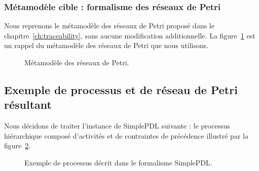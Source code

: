 \FloatBarrier

\subsubsection{Métamodèle cible : formalisme des réseaux de Petri}

Nous reprenons le métamodèle des réseaux de Petri proposé dans le
chapitre~\ref{ch:traceability}, sans aucune modification additionnelle. 
La figure~\ref{fig:petrinetmmodel} est un rappel du métamodèle des réseaux
de Petri que nous utilisons.


\begin{figure}[h]%
  \begin{center}
    
    \caption{Métamodèle des réseaux de Petri.}
    \label{fig:petrinetmmodel}
  \end{center}
\end{figure}

\FloatBarrier

\subsection{Exemple de processus et de réseau de Petri résultant}

Nous décidons de traiter l'instance de SimplePDL suivante : le processus
hiérarchique composé d'activités et de contraintes de précédence illustré par
la figure~\ref{fig:simplepdlusecase}.

\begin{figure}[h]
  \begin{center}
    
    \caption{Exemple de processus décrit dans le formalisme SimplePDL.}
    \label{fig:simplepdlusecase}
  \end{center}
\end{figure}

